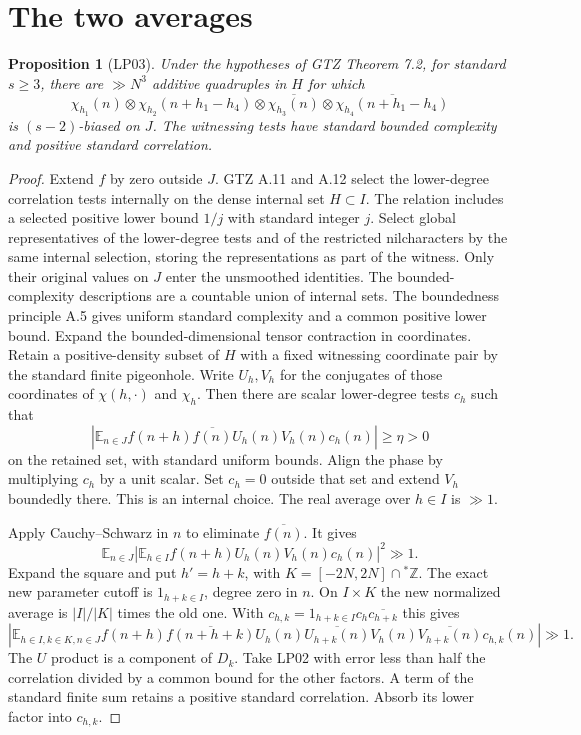 \documentclass[11pt]{article}
\newtheorem{proposition}{Proposition}
\newcommand{\E}{\mathbb E}
\newcommand{\Z}{\mathbb Z}
\begin{document}
\section{The two averages}
\begin{proposition}[LP03]
Under the hypotheses of GTZ Theorem 7.2, for standard $s\ge3$,
there are $\gg N^3$ additive quadruples in $H$ for which
\[
 \chi_{h_1}(n)\otimes\chi_{h_2}(n+h_1-h_4)
 \otimes\overline{\chi_{h_3}(n)}
 \otimes\overline{\chi_{h_4}(n+h_1-h_4)}
\]
is $(s-2)$-biased on $J$. The witnessing tests have standard
bounded complexity and positive standard correlation.
\end{proposition}
\begin{proof}
Extend $f$ by zero outside $J$. GTZ A.11 and A.12 select the
lower-degree correlation tests internally on the dense internal set
$H\subset I$. The relation includes a selected positive lower bound
$1/j$ with standard integer $j$. Select global representatives of the lower-degree tests and of the
restricted nilcharacters by the same internal selection, storing
the representations as part of the witness. Only their original
values on $J$ enter the unsmoothed identities. The bounded-complexity descriptions
are a countable union of internal sets. The boundedness principle
A.5 gives uniform standard complexity and a common positive lower
bound. Expand the bounded-dimensional tensor contraction in
coordinates. Retain a positive-density subset of $H$ with a fixed
witnessing coordinate pair by the standard finite pigeonhole.
Write $U_h,V_h$ for the conjugates of those coordinates of
$\chi(h,\cdot)$ and $\chi_h$. Then there are scalar lower-degree
tests $c_h$ such that
\[
 \left|\E_{n\in J}f(n+h)\overline{f(n)}U_h(n)V_h(n)c_h(n)\right|
 \ge\eta>0
\]
on the retained set, with standard uniform bounds. Align the phase
by multiplying $c_h$ by a unit scalar. Set $c_h=0$ outside that
set and extend $V_h$ boundedly there. This is an internal choice.
The real average over $h\in I$ is $\gg1$.

Apply Cauchy--Schwarz in $n$ to eliminate $\overline{f(n)}$.
It gives
\[
 \E_{n\in J}\left|\E_{h\in I}
       f(n+h)U_h(n)V_h(n)c_h(n)\right|^2\gg1.
\]
Expand the square and put $h'=h+k$, with
$K=[-2N,2N]\cap{}^*\Z$. The exact new parameter cutoff is
$1_{h+k\in I}$, degree zero in $n$. On $I\times K$ the new
normalized average is $|I|/|K|$ times the old one. With
$c_{h,k}=1_{h+k\in I}c_h\overline{c_{h+k}}$ this gives
\[
 \left|\E_{h\in I,k\in K,n\in J}
 f(n+h)\overline{f(n+h+k)}
 U_h(n)\overline{U_{h+k}(n)}
 V_h(n)\overline{V_{h+k}(n)}c_{h,k}(n)\right|\gg1.
\]
The $U$ product is a component of $D_k$. Take LP02 with error
less than half the correlation divided by a common bound for the
other factors. A term of the standard finite sum retains a positive
standard correlation. Absorb its lower factor into $c_{h,k}$.


\end{proof}
\end{document}
